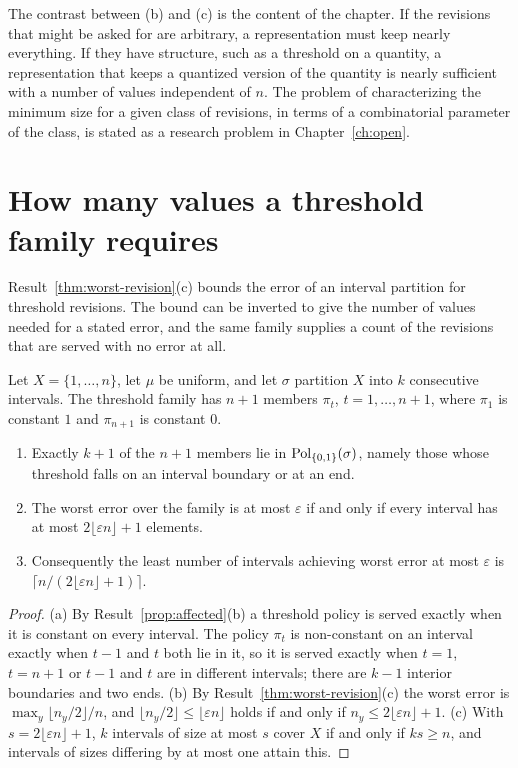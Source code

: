 The contrast between (b) and (c) is the content of the chapter. If the revisions that might be asked for are arbitrary, a representation must keep nearly everything. If they have structure, such as a threshold on a quantity, a representation that keeps a quantized version of the quantity is nearly sufficient with a number of values independent of $n$. The problem of characterizing the minimum size for a given class of revisions, in terms of a combinatorial parameter of the class, is stated as a research problem in Chapter~\ref{ch:open}.


\section{How many values a threshold family requires}\label{sec:threshold-k}

Result~\ref{thm:worst-revision}(c) bounds the error of an interval partition for threshold revisions. The bound can be inverted to give the number of values needed for a stated error, and the same family supplies a count of the revisions that are served with no error at all.

\begin{newresult}\label{prop:threshold-k}
Let $X=\{1,\dots,n\}$, let $\mu$ be uniform, and let $\sigma$ partition $X$ into $k$ consecutive intervals. The threshold family has $n+1$ members $\pi_t$, $t=1,\dots,n+1$, where $\pi_1$ is constant $1$ and $\pi_{n+1}$ is constant $0$.
\begin{enumerate}[nosep,label=(\alph*)]
  \item Exactly $k+1$ of the $n+1$ members lie in $\mathrm{Pol}_{\{0,1\}}(\sigma)$, namely those whose threshold falls on an interval boundary or at an end.
  \item The worst error over the family is at most $\varepsilon$ if and only if every interval has at most $2\lfloor\varepsilon n\rfloor+1$ elements.
  \item Consequently the least number of intervals achieving worst error at most $\varepsilon$ is $\lceil n/(2\lfloor\varepsilon n\rfloor+1)\rceil$.
\end{enumerate}
\end{newresult}
\begin{proof}
(a) By Result~\ref{prop:affected}(b) a threshold policy is served exactly when it is constant on every interval. The policy $\pi_t$ is non-constant on an interval exactly when $t-1$ and $t$ both lie in it, so it is served exactly when $t=1$, $t=n+1$ or $t-1$ and $t$ are in different intervals; there are $k-1$ interior boundaries and two ends. (b) By Result~\ref{thm:worst-revision}(c) the worst error is $\max_y\lfloor n_y/2\rfloor/n$, and $\lfloor n_y/2\rfloor\le\lfloor\varepsilon n\rfloor$ holds if and only if $n_y\le2\lfloor\varepsilon n\rfloor+1$. (c) With $s=2\lfloor\varepsilon n\rfloor+1$, $k$ intervals of size at most $s$ cover $X$ if and only if $ks\ge n$, and intervals of sizes differing by at most one attain this.
\end{proof}

